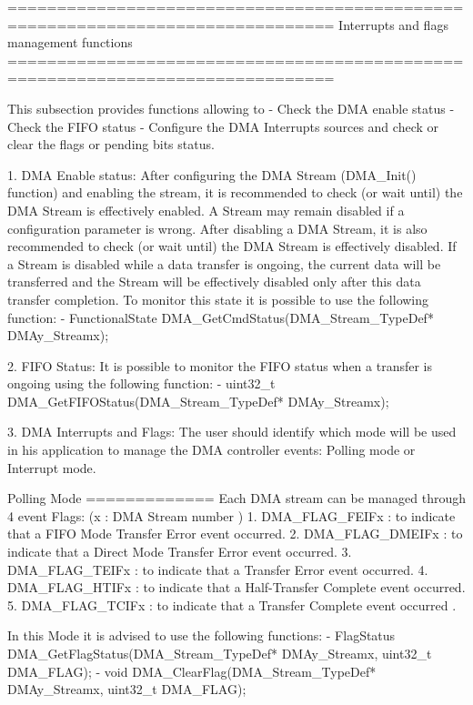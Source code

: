 \begin{DoxyVerb} ===============================================================================
                  Interrupts and flags management functions
 ===============================================================================  

  This subsection provides functions allowing to
   - Check the DMA enable status
   - Check the FIFO status 
   - Configure the DMA Interrupts sources and check or clear the flags or pending bits status.   
   
 1. DMA Enable status:
   After configuring the DMA Stream (DMA_Init() function) and enabling the stream,
   it is recommended to check (or wait until) the DMA Stream is effectively enabled.
   A Stream may remain disabled if a configuration parameter is wrong.
   After disabling a DMA Stream, it is also recommended to check (or wait until) the DMA
   Stream is effectively disabled. If a Stream is disabled while a data transfer is ongoing, 
   the current data will be transferred and the Stream will be effectively disabled only after
   this data transfer completion.
   To monitor this state it is possible to use the following function:
     - FunctionalState DMA_GetCmdStatus(DMA_Stream_TypeDef* DMAy_Streamx); 
 
 2. FIFO Status:
   It is possible to monitor the FIFO status when a transfer is ongoing using the following 
   function:
     - uint32_t DMA_GetFIFOStatus(DMA_Stream_TypeDef* DMAy_Streamx); 
 
 3. DMA Interrupts and Flags:
  The user should identify which mode will be used in his application to manage the
  DMA controller events: Polling mode or Interrupt mode. 
    
  Polling Mode
  =============
    Each DMA stream can be managed through 4 event Flags:
    (x : DMA Stream number )
       1. DMA_FLAG_FEIFx  : to indicate that a FIFO Mode Transfer Error event occurred.
       2. DMA_FLAG_DMEIFx : to indicate that a Direct Mode Transfer Error event occurred.
       3. DMA_FLAG_TEIFx  : to indicate that a Transfer Error event occurred.
       4. DMA_FLAG_HTIFx  : to indicate that a Half-Transfer Complete event occurred.
       5. DMA_FLAG_TCIFx  : to indicate that a Transfer Complete event occurred .       

   In this Mode it is advised to use the following functions:
      - FlagStatus DMA_GetFlagStatus(DMA_Stream_TypeDef* DMAy_Streamx, uint32_t DMA_FLAG);
      - void DMA_ClearFlag(DMA_Stream_TypeDef* DMAy_Streamx, uint32_t DMA_FLAG);


\end{DoxyVerb}

